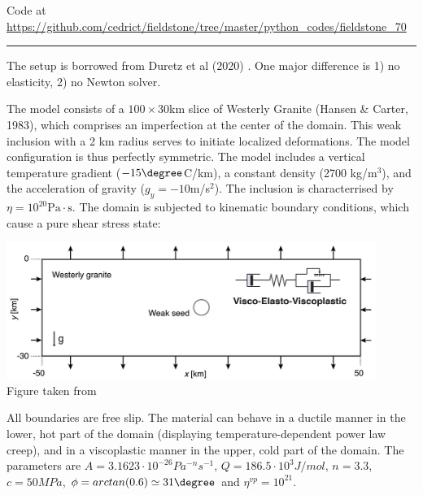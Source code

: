 

\begin{center}
Code at \url{https://github.com/cedrict/fieldstone/tree/master/python_codes/fieldstone_70}
\end{center}

\par\noindent\rule{\textwidth}{0.4pt}


The setup is borrowed from Duretz et al (2020) \cite{dudy20}. One major difference is 1) no elasticity,
2) no Newton solver.


The model consists of a $100\times 30$km slice of Westerly Granite (Hansen \& Carter, 1983), 
which comprises an imperfection at the center of the domain.
This weak inclusion with a 2 km radius serves to initiate
localized deformations. The model configuration is thus perfectly symmetric. 
The model includes a vertical temperature gradient ($-15\degree$C/km), 
a constant density (2700 kg/m$^3$), and the acceleration of gravity ($g_y=-10$m/s$^2$).
The inclusion is characterrised by $\eta=10^{20}\text{Pa}\cdot \text{s}$.
The domain is subjected to kinematic boundary conditions, which cause a pure shear stress
state:

\begin{center}
\includegraphics[width=12cm]{python_codes/fieldstone_70/images/fig1}\\
{\captionfont Figure taken from \cite{dudy20}}
\end{center}

All boundaries are free slip. The material can behave in a ductile manner in the lower, hot
part of the domain (displaying temperature-dependent power law creep), and in a viscoplastic 
manner in the upper, cold part of the domain. 
The parameters are 
$A=3.1623\cdot 10^{-26}Pa^{-n}s^{-1}$, $Q=186.5\cdot 10^3 J/mol$, $n=3.3$, $c=50MPa$, 
$\phi=arctan(0.6)\simeq 31\degree$ and $\eta^{vp}=10^{21}$. 

